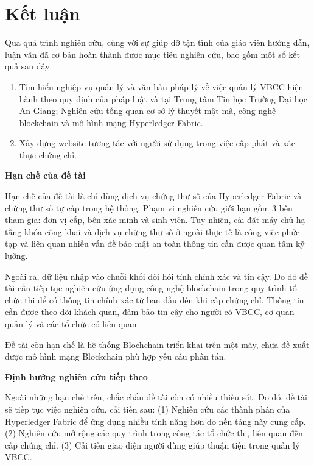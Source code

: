 \chapter{Kết luận}
Qua quá trình nghiên cứu, cùng với sự giúp đỡ tận tình của giáo viên hướng dẫn, luận văn đã cơ bản hoàn thành được mục tiêu nghiên cứu, bao gồm một số kết quả sau đây:

\begin{enumerate}

\item Tìm hiểu nghiệp vụ quản lý và văn bản pháp lý về việc quản lý VBCC hiện hành theo quy định của pháp luật và tại Trung tâm Tin học Trường Đại học An Giang; Nghiên cứu tổng quan cơ sở lý thuyết mật mã, công nghệ blockchain và mô hình mạng Hyperledger Fabric.

\item Xây dựng website tương tác với người sử dụng trong việc cấp phát và xác thực chứng chỉ.

\end{enumerate}

\textbf{Hạn chế của đề tài}

Hạn chế của đề tài là chỉ dùng dịch vụ chứng thư số của Hyperledger Fabric và chứng thư số tự cấp trong hệ thống. Phạm vi nghiên cứu giới hạn gồm 3 bên tham gia: đơn vị cấp, bên xác minh và sinh viên. Tuy nhiên, cài đặt máy chủ hạ tầng khóa công khai và dịch vụ chứng thư số ở ngoài thực tế là công việc phức tạp và liên quan nhiều vấn đề bảo mật an toàn thông tin cần được quan tâm kỹ lưỡng.

Ngoài ra, dữ liệu nhập vào chuỗi khối đòi hỏi tính chính xác và tin cậy. Do đó đề tài cần tiếp tục nghiên cứu ứng dụng công nghệ blockchain trong quy trình tổ chức thi để có thông tin chính xác từ ban đầu đến khi cấp chứng chỉ. Thông tin cần được theo dõi khách quan, đảm bảo tin cậy cho người có VBCC, cơ quan quản lý và các tổ chức có liên quan.

Đề tài còn hạn chế là hệ thống Blochchain triển khai trên một máy, chưa đề xuất được mô hình mạng Blockchain phù hợp yêu cầu phân tán. 

\textbf{Định hướng nghiên cứu tiếp theo}

Ngoài những hạn chế trên, chắc chắn đề tài còn có nhiều thiếu sót. Do đó, đề tài sẽ tiếp tục việc nghiên cứu, cải tiến sau: (1) Nghiên cứu các thành phần của Hyperledger Fabric để ứng dụng nhiều tính năng hơn do nền tảng này cung cấp. (2) Nghiên cứu mở rộng các quy trình trong công tác tổ chức thi, liên quan đến cấp chứng chỉ. (3) Cải tiến giao diện người dùng giúp thuận tiện trong quản lý VBCC.
